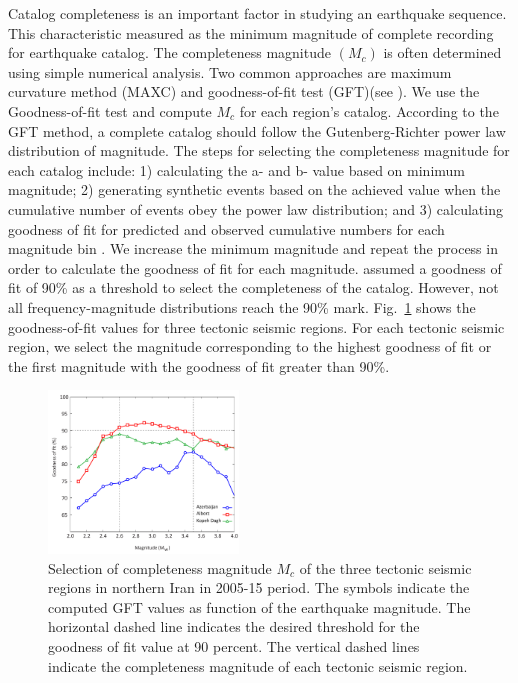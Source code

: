 Catalog completeness is an important factor in studying an earthquake sequence. This characteristic measured as the minimum magnitude of complete recording for earthquake catalog. The completeness magnitude $(M_c)$ is often determined using simple numerical analysis. Two common approaches are maximum curvature method (MAXC) and goodness-of-fit test (GFT)(see \citet{Wiemer2000}). We use the Goodness-of-fit test and compute $M_c$ for each region's catalog. According to the GFT method, a complete catalog should follow the Gutenberg-Richter power law distribution of magnitude. The steps for selecting the completeness magnitude for each catalog include: 1) calculating the a-  and  b-  value based on minimum magnitude; 2) generating  synthetic events based on the achieved value when the cumulative number of events obey the power law distribution; and 3) calculating goodness of fit for predicted and observed cumulative numbers for each magnitude bin  \citep{Wiemer2000}. We increase the minimum magnitude and repeat the process in order to calculate the goodness of fit for each magnitude.  \citet{Wiemer2000} assumed a goodness of fit of 90\% as a threshold to select the completeness of the catalog. However,  not all frequency-magnitude distributions reach the 90\% mark. Fig.~\ref{fig:completeness} shows the goodness-of-fit values for three tectonic seismic regions. For each tectonic seismic region, we select the magnitude corresponding to the highest goodness of fit or the first magnitude with the goodness of fit greater than 90\%.

\begin{figure}[t]
\centering
\includegraphics[width=0.45\textwidth]{figures/pdf/Figure05.pdf} 
\caption{ Selection of completeness magnitude $M_c$ of the three tectonic seismic regions in northern Iran in 2005-15 period. The symbols indicate the computed GFT values as function of the earthquake magnitude. The horizontal dashed line indicates the desired threshold for the goodness of fit value at 90 percent. The vertical dashed lines indicate the completeness magnitude of each tectonic seismic region.}
\label{fig:completeness}
\end{figure} 

